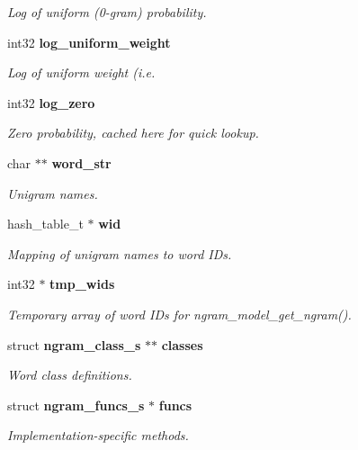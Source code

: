\begin{CompactItemize}
\begin{CompactList}\small\item\em Log of uniform (0-gram) probability. \item\end{CompactList}\item 
int32 {\bf log\_\-uniform\_\-weight}
\begin{CompactList}\small\item\em Log of uniform weight (i.e. \item\end{CompactList}\item 
int32 {\bf log\_\-zero}\label{structngram__model__s_65425a599c4bcc4dda809d81149b8fc0}

\begin{CompactList}\small\item\em Zero probability, cached here for quick lookup. \item\end{CompactList}\item 
char $\ast$$\ast$ {\bf word\_\-str}\label{structngram__model__s_e625e779e340845f03fb3da164e93039}

\begin{CompactList}\small\item\em Unigram names. \item\end{CompactList}\item 
hash\_\-table\_\-t $\ast$ {\bf wid}
\begin{CompactList}\small\item\em Mapping of unigram names to word IDs. \item\end{CompactList}\item 
int32 $\ast$ {\bf tmp\_\-wids}\label{structngram__model__s_4f910ab2c18b0e68dce92816a27fb139}

\begin{CompactList}\small\item\em Temporary array of word IDs for ngram\_\-model\_\-get\_\-ngram(). \item\end{CompactList}\item 
struct {\bf ngram\_\-class\_\-s} $\ast$$\ast$ {\bf classes}
\begin{CompactList}\small\item\em Word class definitions. \item\end{CompactList}\item 
struct {\bf ngram\_\-funcs\_\-s} $\ast$ {\bf funcs}
\begin{CompactList}\small\item\em Implementation-specific methods. \item\end{CompactList}\end{CompactItemize}


